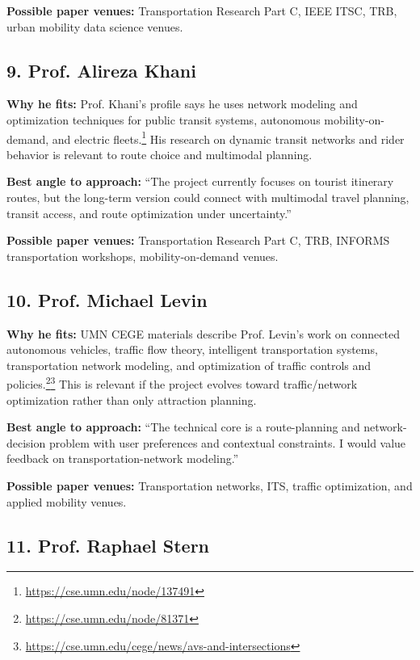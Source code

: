 \documentclass[11pt,a4paper]{article}
\begin{document}
\noindent \textbf{Possible paper venues:} Transportation Research Part C, IEEE ITSC, TRB, urban mobility data science venues.

\subsection*{9. Prof. Alireza Khani}

\noindent \textbf{Why he fits:} Prof. Khani's profile says he uses network modeling and optimization techniques for public transit systems, autonomous mobility-on-demand, and electric fleets.\footnote{\url{https://cse.umn.edu/node/137491}} His research on dynamic transit networks and rider behavior is relevant to route choice and multimodal planning.

\noindent \textbf{Best angle to approach:} ``The project currently focuses on tourist itinerary routes, but the long-term version could connect with multimodal travel planning, transit access, and route optimization under uncertainty.''

\noindent \textbf{Possible paper venues:} Transportation Research Part C, TRB, INFORMS transportation workshops, mobility-on-demand venues.

\subsection*{10. Prof. Michael Levin}

\noindent \textbf{Why he fits:} UMN CEGE materials describe Prof. Levin's work on connected autonomous vehicles, traffic flow theory, intelligent transportation systems, transportation network modeling, and optimization of traffic controls and policies.\footnote{\url{https://cse.umn.edu/node/81371}}\footnote{\url{https://cse.umn.edu/cege/news/avs-and-intersections}} This is relevant if the project evolves toward traffic/network optimization rather than only attraction planning.

\noindent \textbf{Best angle to approach:} ``The technical core is a route-planning and network-decision problem with user preferences and contextual constraints. I would value feedback on transportation-network modeling.''

\noindent \textbf{Possible paper venues:} Transportation networks, ITS, traffic optimization, and applied mobility venues.

\subsection*{11. Prof. Raphael Stern}
\end{document}
